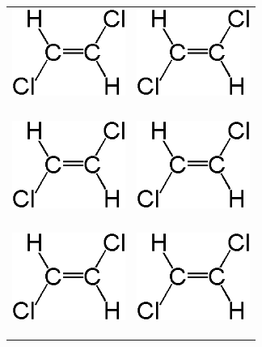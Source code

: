 \documentclass[10pt, letterpaper]{memoir}
\begin{document}
	\begin{tabular}{lr}
		\includegraphics[width = 10em]{t_dichloroethene} \hspace{12em} & \includegraphics[width = 10em]{t_dichloroethene}\\ \\ \\ \\ \\
		\includegraphics[width = 10em]{t_dichloroethene} \hspace{12em} & \includegraphics[width = 10em]{t_dichloroethene} \\ \\ \\ \\ \\
		\includegraphics[width = 10em]{t_dichloroethene} \hspace{12em} & \includegraphics[width = 10em]{t_dichloroethene}\\ \\ \\ \\ 
	\end{tabular}
	
\end{document}
